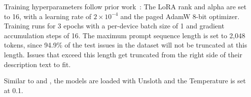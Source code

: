 Training hyperparameters follow prior work~\cite{heo2025study,aracena2025applying}: The LoRA rank and alpha are set to 16, with a learning rate of $2 \times 10^{-4}$ and the paged AdamW 8-bit optimizer. Training runs for 3 epochs with a per-device batch size of 1 and gradient accumulation steps of 16. The maximum prompt sequence length is set to 2,048 tokens, since 94.9\% of the test issues in the dataset will not be truncated at this length. Issues that exceed this length get truncated from the right side of their description text to fit.

Similar to \ragtag and \bragtag, the models are loaded with Unsloth and the Temperature is set at 0.1.


